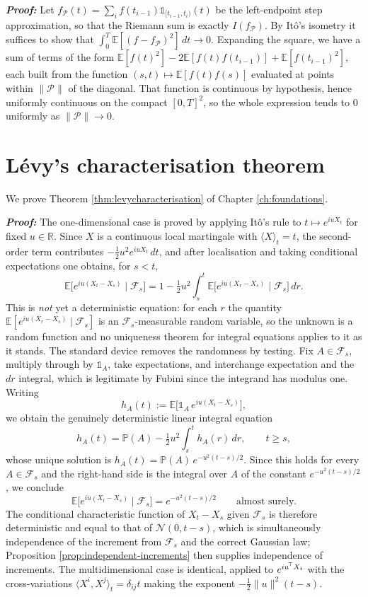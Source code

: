 \textbf{\textit{Proof:}} Let $f_\mathcal{P}(t) = \sum_i f(t_{i-1})\mathds{1}_{[t_{i-1},t_i)}(t)$ be
the left-endpoint step approximation, so that the Riemann sum is exactly $I(f_\mathcal{P})$. By Itô's
isometry it suffices to show that $\int_0^T \mathbb{E}[(f - f_\mathcal{P})^2]\,dt \to 0$. Expanding
the square, we have a sum of terms of the form
$\mathbb{E}[f(t)^2] - 2\mathbb{E}[f(t)f(t_{i-1})] + \mathbb{E}[f(t_{i-1})^2]$, each built from the
function $(s,t)\mapsto\mathbb{E}[f(t)f(s)]$ evaluated at points within $\lVert\mathcal{P}\rVert$ of
the diagonal. That function is continuous by hypothesis, hence uniformly continuous on the compact
$[0,T]^2$, so the whole expression tends to $0$ uniformly as $\lVert\mathcal{P}\rVert \to 0$. \qedfilledtext

\section{Lévy's characterisation theorem}\label{app:proof:levy}
We prove Theorem \ref{thm:levycharacterisation} of Chapter \ref{ch:foundations}.

\textbf{\textit{Proof:}} The one-dimensional case is proved by applying Itô's rule to
$t \mapsto e^{iuX_t}$ for fixed $u \in \mathbb{R}$. Since $X$ is a continuous local martingale with
$\langle X\rangle_t = t$, the second-order term contributes $-\tfrac12 u^2 e^{iuX_t}\,dt$, and after
localisation and taking conditional expectations one obtains, for $s<t$,
\[
\mathbb{E}\bigl[e^{iu(X_t - X_s)} \mid \mathcal{F}_s\bigr]
= 1 - \tfrac12 u^2 \int_s^t \mathbb{E}\bigl[e^{iu(X_r-X_s)}\mid\mathcal{F}_s\bigr]\,dr .
\]
This is \emph{not} yet a deterministic equation: for each $r$ the quantity
$\mathbb{E}[e^{iu(X_r-X_s)}\mid\mathcal{F}_s]$ is an $\mathcal{F}_s$-measurable random variable, so
the unknown is a random function and no uniqueness theorem for integral equations applies to it as it
stands. The standard device removes the randomness by testing. Fix $A \in \mathcal{F}_s$, multiply
through by $\mathds{1}_A$, take expectations, and interchange expectation and the $dr$ integral,
which is legitimate by Fubini since the integrand has modulus one. Writing
\[
h_A(t) := \mathbb{E}\bigl[\mathds{1}_A\,e^{iu(X_t-X_s)}\bigr],
\]
we obtain the genuinely deterministic linear integral equation
\[
h_A(t) = \mathbb{P}(A) - \tfrac12 u^2 \int_s^t h_A(r)\,dr, \qquad t \geq s,
\]
whose unique solution is $h_A(t) = \mathbb{P}(A)\,e^{-u^2(t-s)/2}$. Since this holds for every
$A \in \mathcal{F}_s$ and the right-hand side is the integral over $A$ of the constant
$e^{-u^2(t-s)/2}$, we conclude
\[
\mathbb{E}\bigl[e^{iu(X_t-X_s)} \mid \mathcal{F}_s\bigr] = e^{-u^2(t-s)/2} \qquad \text{almost surely.}
\]
The conditional characteristic function of $X_t - X_s$ given $\mathcal{F}_s$ is therefore
deterministic and equal to that of $\mathcal{N}(0,t-s)$, which is simultaneously
independence of the increment from $\mathcal{F}_s$ and the correct Gaussian law; Proposition
\ref{prop:independent-increments} then supplies independence of increments. The multidimensional case
is identical, applied to $e^{iu^{\!\top} X_t}$ with the cross-variations $\langle X^i,X^j\rangle_t
= \delta_{ij}t$ making the exponent $-\tfrac12\lVert u\rVert^2(t-s)$. \qedfilledtext

